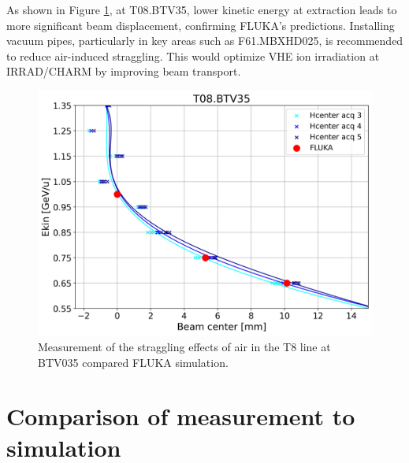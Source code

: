 \documentclass[a4paper,
               biblatex,     %
               ]{jacow}
\begin{document}
As shown in Figure \ref{fig:straggling_effects}, at T08.BTV35, lower kinetic energy at extraction leads to more significant beam displacement, confirming FLUKA's predictions. Installing vacuum pipes, particularly in key areas such as F61.MBXHD025, is recommended to reduce air-induced straggling. This would optimize VHE ion irradiation at IRRAD/CHARM by improving beam transport.

\begin{figure}[!htb]
   \centering
   \includegraphics*[width=0.9\columnwidth]{straggling_effects.png}
   \caption{Measurement of the straggling effects of air in the T8 line at BTV035 compared FLUKA simulation.}
   \label{fig:straggling_effects}
\end{figure}




\section{Comparison of measurement to simulation}

\end{document}
